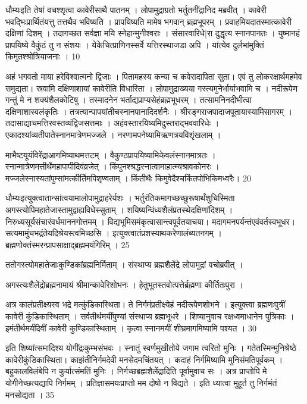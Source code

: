   धौम्यःइति तेषां वचश्शृत्वा कावेरीसाथै पातनम् ।
 लोपामुद्राग्रतो भर्तुतनींद्रानिद मब्रवीत् ।
 कावेरी
भवद्भिःप्रार्थितंयत्तु तत्तथैव भविष्यति ।
 प्रापयिष्यति मामेष भगवान् ब्रह्मभूपरम् ।
 प्रवाहमियदातस्मात्कावेरी दक्षिणां दिशम् ।
 तदागच्छत सर्वज्ञा मयि स्नेहान्मुनीश्वराः ।
 संसारवारिधे|रा दुद्धृत्य स्नानपानतः ।
 युष्मानहं प्रापयिष्ये वैकुंठं तु न संशयः ।
 येकेचित्प्राणिनस्सर्वे यत्तिरस्थाजडा अपि ।
 यांत्येव दुर्लभांमुक्तिं किमुतश्श्रोत्रियाजनाः ।
 10

  अहं भगवतो माया हरेविश्वात्मनो द्विजाः ।
 पितामहस्य कन्या च कवेरादापिता सुता।
 एवं तु लोकरक्षार्थमहमेव समुद्यता।
 स्रवामि दक्षिणाशायां कावेरीति विधारिता ।
 लोपामुद्राख्यया गस्त्यमुनेर्भार्याभवामि च ।
 नदीरूपेण गन्तुं मे न शक्यंशैलकोटिषु ।
 तस्मादनेन भर्ताद्यप्राप्यसेहंब्रह्मभूधरम् ।
 तत्सामनिनदीभीत्वा दक्षिणाशास्वलंकृतिः ।
 तत्रत्यान्पापयांतीचस्नानपानादिदर्शनैः ।
 श्रीरङ्गराजपादाजपूतायास्यामिसागरम् ।
 तदासाद्याचमत्तिरवस्तव्यंद्विजसत्तमाः ।
 अहंवस्तारयिष्यमिदुस्तराद्भववारिधेः ।
 एकादश्यांव्यतीपातेस्नानमात्रेणमज्जले ।
 नरणामपनेष्यामिऋणत्रयविशृंखलाम् ।
 
माभैष्टयूयंविरेंद्राआगमिष्याथमत्तटम् ।
 वैकुण्ठप्रापयिष्यामिकेवलंस्नानमात्रतः ।
 स्नान्मात्रेणमत्तीर्थेमहापापीदिवंव्रजेत् ।
 किंपुनश्श्रद्धस्नात्वामाहात्म्यश्रावकोनरः ।
 मज्जलेस्नास्यतांपुम्सांमत्कीर्तिमपिशृण्वताम् ।
 किंतीथैः किमुवेदैश्चकिंतपोभिकिमध्वरैः।
 20

  धौम्यःइत्युक्त्वातान्सांत्वयामालोपामुद्राहरेर्यशः ।
 भर्तुरंतिकमागच्छच्छुरूषार्थंशुचिस्मिता अगस्त्योपिमहातेजास्तामुद्वाह्यविधेस्सुताम् ।
 शयिष्यन्विंध्यशैलंप्रतस्थेदक्षिणांदिशम् ।
 निरुध्यसूर्यसंचारंवर्धमाननगोत्तमम् ।
 विद्यभूमिसमंकृत्वासान्त्वपूर्वतयाचया।
 मदागमनपर्यन्तंएवंवर्तस्वभूधर।
 सत्यमामुंचभद्रंतेयदिश्रेयस्त्वमिच्छसि ।
 इत्युक्त्वातंप्रशस्याथकरेणालंब्यतनगम् ।
 ब्रह्मणोक्तंस्मरन्प्रापसाक्षाद्ब्रह्ममयंगिरिम् ।
 25

  ततोगस्त्योमहातेजाःकुण्डिकांब्रह्मनिर्मिताम् ।
 संस्थाप्य ब्रह्मशैलेंद्रे लोपामुद्रां वचोब्रवीत् ।
 
अगस्त्यःशैलेंद्रोब्रह्मनामायं श्रीमान्कावेरिशोभनः ।
 हेतुभूतस्तवोत्पत्तेर्ब्रह्मणा कीर्तितःपुरा ।
 
अत्र कालंप्रतीक्ष्यस्व भद्रे मत्कुंडिकास्थिता।
 ते निर्गमंप्रतीक्ष्येहं नदीरूपेणशोभने ।
 इत्युक्त्वा ब्रह्मणःपुत्रीं कावेरी कुंडिकास्थिताम् ।
 सर्वतीर्थमयींपुण्यां संस्थाप्य ब्रह्मभूधरे ।
 शिष्यानुवाच रक्षध्वमाधानेन पुत्रिकाः ।
 इमंतीर्थमयींदेवीं कावेरी कुण्डिकास्थिताम् ।
 कृत्वा स्नानमयीं शीघ्रमागमिष्यामि पश्यत ।
 30

  इति शिष्यांत्समादिश्य योगींद्रःकुम्भसंभवः ।
 स्नातुं स्वर्णमुखीतोये जगाम त्वरितो मुनिः ।
 गतेतस्मिन्मुनिश्रेष्ठे कावेरीकुंडिकास्थिता।
 काझंतीनिर्गमदेवी मनसेदमचिंतयत् ।
 कदाहं निर्गमिष्यामि मुनिसंमतिपूर्वकम् ।
 बहुकालविलंबेपि न कुर्यात्संमतिं मुनिः ।
 निर्गच्छब्रह्मशैलेंद्रादिति पूर्वामुवाच सः ।
 अत्र प्राप्तोपि मे योगीनेच्छत्यद्यापि निर्गमम् ।
 प्रतिज्ञासमयःप्राप्तो मम दोषो न विद्यते ।
 इति ध्यात्वा मुहूर्त तु निर्गमंतं मनसोद्यता ।
 35

